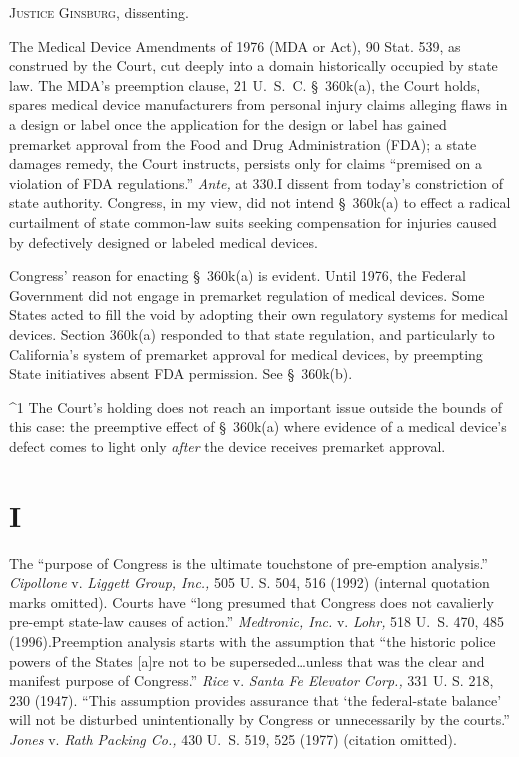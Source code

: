 
\setcounter{page}{333}

  \textsc{Justice Ginsburg,} dissenting.

  The Medical Device Amendments of 1976 (MDA or Act), 90 Stat. 539,
as construed by the Court, cut deeply into a domain historically
occupied by state law. The MDA's preemption clause, 21 U.~S.~C.
\S~360k(a), the Court holds, spares medical device manufacturers from
personal injury claims alleging flaws in a design or label once the
application for the design or label has gained premarket approval from
the Food and Drug Administration (FDA); a state damages remedy, the
Court instructs, persists only for claims ``premised on a violation of
FDA regulations.'' \emph{Ante,} at 330.\footnotemark[1] I dissent from today's
constriction of state authority. Congress, in my view, did not intend
\S~360k(a) to effect a radical curtailment of state common-law suits
seeking compensation for injuries caused by defectively designed or
labeled medical devices.

  Congress' reason for enacting \S~360k(a) is evident. Until 1976,
the Federal Government did not engage in premarket regulation of medical
devices. Some States acted to fill the void by adopting their own
regulatory systems for medical devices. Section 360k(a) responded to
that state regulation, and particularly to California's system of
premarket approval for medical devices, by preempting State initiatives
absent FDA permission. See \S~360k(b).\newpage 

^1 The Court's holding does not reach an important issue outside the
bounds of this case: the preemptive effect of \S~360k(a) where evidence
of a medical device's defect comes to light only \emph{after} the device
receives premarket approval.

\section{I}

  The ``purpose of Congress is the ultimate touchstone of pre-emption
analysis.'' \emph{Cipollone} v. \emph{Liggett Group, Inc.,} 505 U. S.
504, 516 (1992) (internal quotation marks omitted). Courts have
``long presumed that Congress does not cavalierly pre-empt state-law
causes of action.'' \emph{Medtronic, Inc.} v. \emph{Lohr,} 518 U.~S.
470, 485 (1996).\footnotemark[2] Preemption analysis starts with the assumption
that ``the historic police powers of the States [a]re not to be
superseded\dots unless that was the clear and manifest purpose of
Congress.'' \emph{Rice} v. \emph{Santa Fe Elevator Corp.,} 331 U. S.
218, 230 (1947). ``This assumption provides assurance that ‘the
federal-state balance' will not be disturbed unintentionally by
Congress or unnecessarily by the courts.'' \emph{Jones} v. \emph{Rath
Packing Co.,} 430 U.~S. 519, 525 (1977) (citation omitted).

